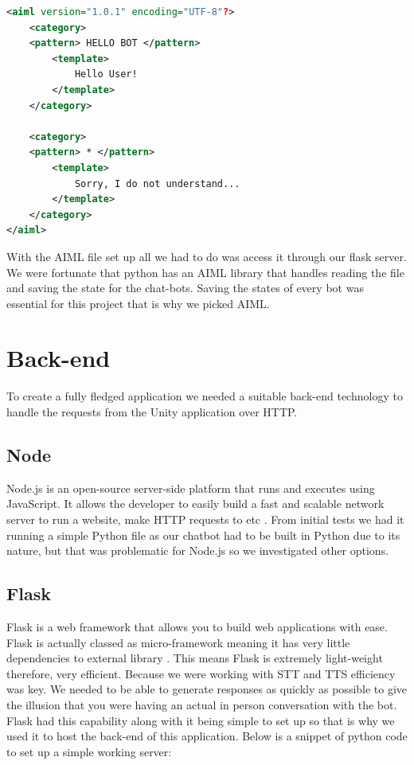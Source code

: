 \begin{lstlisting}[language=XML]
<aiml version="1.0.1" encoding="UTF-8"?>
    <category>
    <pattern> HELLO BOT </pattern>
        <template>
            Hello User!
        </template>
    </category>
    
    <category>
    <pattern> * </pattern>
        <template>
            Sorry, I do not understand...
        </template>
    </category>
</aiml>

\end{lstlisting}

With the AIML file set up all we had to do was access it through our flask server. We were fortunate that python has an AIML library that handles reading the file and saving the state for the chat-bots. Saving the states of every bot was essential for this project that is why we picked AIML.

\section{Back-end}
To create a fully fledged application we needed a suitable back-end technology to handle the requests from the Unity application over HTTP.

\subsection{Node}
Node.js is an open-source server-side platform that runs and executes using JavaScript. It allows the developer to easily build a fast and scalable network server to run a website, make HTTP requests to etc \cite{node}. From initial tests we had it running a simple Python file as our chatbot had to be built in Python due to its nature, but that was problematic for Node.js so we investigated other options.

\subsection{Flask}
Flask is a web framework that allows you to build web applications with ease. Flask is actually classed as micro-framework meaning it has very little dependencies to external library \cite{flask}. This means Flask is extremely light-weight therefore, very efficient. Because we were working with STT and TTS efficiency was key. We needed to be able to generate responses as quickly as possible to give the illusion that you were having an actual in person conversation with the bot. Flask had this capability along with it being simple to set up so that is why we used it to host the back-end of this application. Below is a snippet of python code to set up a simple working server:

